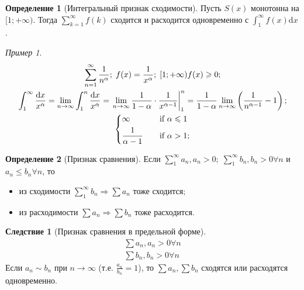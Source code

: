 \documentclass[a4paper,12pt]{article}
\theoremstyle{remark}
\newtheorem*{example}{Пример}
\theoremstyle{definition}
\newtheorem{definition}{Определение}
\newtheorem*{effect}{Следствие}
\begin{document}
\begin{definition}[Интегральный признак сходимости]
    Пусть \(S(x)\) монотонна на \([1;+\infty)\). Тогда \(\sum_{k = 1}^{\infty} f(k)\) сходится и расходится одновременно с \(\int_{1}^{\infty} \! f(x) \mathrm{d}x\).
\end{definition}

\begin{example}
    \begin{gather*}
        \sum_{n=1}^{\infty} \frac{1}{n^\alpha};\; f(x) = \frac{1}{x^\alpha};\; [1;+\infty) f(x) \geqslant 0; \\
        \int_{1}^{\infty} \frac{\mathrm{d}x}{x^\alpha} = \lim_{n \rightarrow \infty} \int_{1}^{n} \frac{\mathrm{d}x}{x^\alpha} = \left. \lim_{n \rightarrow \infty} \frac{1}{1 - \alpha} \cdot \frac{1}{x^{\alpha - 1}} \right |_1^n = \frac{1}{1 - \alpha} \lim_{n \rightarrow \infty} \left({\frac{1}{n^{\alpha - 1}} - 1}\right); \\
        \begin{dcases}
            \infty & \quad \text{if } \alpha \leqslant 1 \\
            \frac{1}{\alpha - 1} & \quad \text{if } \alpha > 1;
        \end{dcases}
    \end{gather*}
\end{example}


\begin{definition}[Признак сравнения]
    Если \(\sum_{1}^{\infty} a_n, a_n > 0;\; \sum_{1}^{\infty} b_n, b_n > 0 \forall n\) и \(a_n \leqslant b_n \forall n\), то
    \begin{itemize}
        \item из сходимости \(\sum_{1}^{\infty} b_n \Rightarrow \sum a_n\) тоже сходится;
        \item из расходимости \(\sum a_n \Rightarrow \sum b_n\) тоже расходится.
    \end{itemize}
\end{definition}

\begin{effect}[Признак сравнения в предельной форме]
    \begin{gather*}
        \sum a_n, a_n > 0 \forall n \\
        \sum b_n, b_n > 0 \forall n
    \end{gather*}
    Если \(a_n \sim b_n\) при \(n \rightarrow \infty\) (т.е. \(\frac{a_n}{b_n} = 1\)), то \(\sum a_n, \sum b_n\) сходятся или расходятся одновременно.
\end{effect}
\end{document}
